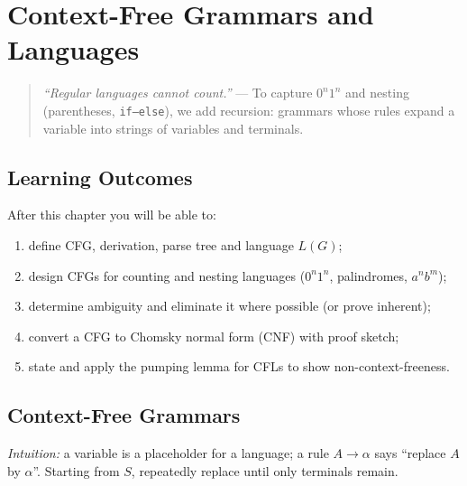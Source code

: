 \chapter{Context-Free Grammars and Languages}
\label{ch:contextfree}

\begin{quote}
\emph{``Regular languages cannot count.''} --- To capture $0^n1^n$ and nesting (parentheses, \texttt{if--else}), we add recursion: grammars whose rules expand a variable into strings of variables and terminals.
\end{quote}

\noindent{}
\vspace{0.4em}

\section*{Learning Outcomes}
After this chapter you will be able to:
\begin{enumerate}[label=(L\arabic*)]
    \item define CFG, derivation, parse tree and language $L(G)$;
    \item design CFGs for counting and nesting languages ($0^n1^n$, palindromes, $a^nb^m$);
    \item determine ambiguity and eliminate it where possible (or prove inherent);
    \item convert a CFG to Chomsky normal form (CNF) with proof sketch;
    \item state and apply the pumping lemma for CFLs to show non-context-freeness.
\end{enumerate}

\section{Context-Free Grammars}
\label{sec:cfg-def}
\emph{Intuition:} a variable is a placeholder for a language; a rule $A\to\alpha$ says ``replace $A$ by $\alpha$''. Starting from $S$, repeatedly replace until only terminals remain.

